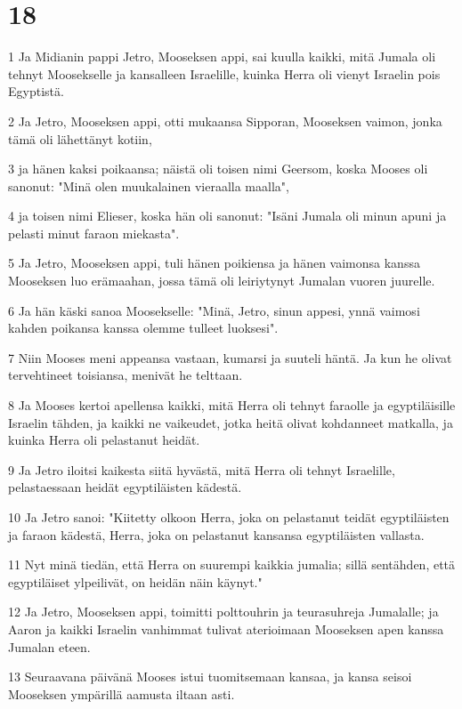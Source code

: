 \chapter{18}

\par 1 Ja Midianin pappi Jetro, Mooseksen appi, sai kuulla kaikki, mitä Jumala oli tehnyt Moosekselle ja kansalleen Israelille, kuinka Herra oli vienyt Israelin pois Egyptistä.
\par 2 Ja Jetro, Mooseksen appi, otti mukaansa Sipporan, Mooseksen vaimon, jonka tämä oli lähettänyt kotiin,
\par 3 ja hänen kaksi poikaansa; näistä oli toisen nimi Geersom, koska Mooses oli sanonut: "Minä olen muukalainen vieraalla maalla",
\par 4 ja toisen nimi Elieser, koska hän oli sanonut: "Isäni Jumala oli minun apuni ja pelasti minut faraon miekasta".
\par 5 Ja Jetro, Mooseksen appi, tuli hänen poikiensa ja hänen vaimonsa kanssa Mooseksen luo erämaahan, jossa tämä oli leiriytynyt Jumalan vuoren juurelle.
\par 6 Ja hän käski sanoa Moosekselle: "Minä, Jetro, sinun appesi, ynnä vaimosi kahden poikansa kanssa olemme tulleet luoksesi".
\par 7 Niin Mooses meni appeansa vastaan, kumarsi ja suuteli häntä. Ja kun he olivat tervehtineet toisiansa, menivät he telttaan.
\par 8 Ja Mooses kertoi apellensa kaikki, mitä Herra oli tehnyt faraolle ja egyptiläisille Israelin tähden, ja kaikki ne vaikeudet, jotka heitä olivat kohdanneet matkalla, ja kuinka Herra oli pelastanut heidät.
\par 9 Ja Jetro iloitsi kaikesta siitä hyvästä, mitä Herra oli tehnyt Israelille, pelastaessaan heidät egyptiläisten kädestä.
\par 10 Ja Jetro sanoi: "Kiitetty olkoon Herra, joka on pelastanut teidät egyptiläisten ja faraon kädestä, Herra, joka on pelastanut kansansa egyptiläisten vallasta.
\par 11 Nyt minä tiedän, että Herra on suurempi kaikkia jumalia; sillä sentähden, että egyptiläiset ylpeilivät, on heidän näin käynyt."
\par 12 Ja Jetro, Mooseksen appi, toimitti polttouhrin ja teurasuhreja Jumalalle; ja Aaron ja kaikki Israelin vanhimmat tulivat aterioimaan Mooseksen apen kanssa Jumalan eteen.
\par 13 Seuraavana päivänä Mooses istui tuomitsemaan kansaa, ja kansa seisoi Mooseksen ympärillä aamusta iltaan asti.
